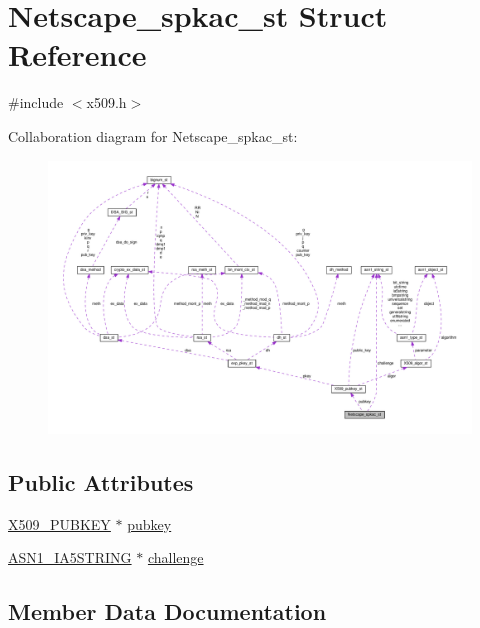 \hypertarget{struct_netscape__spkac__st}{}\section{Netscape\+\_\+spkac\+\_\+st Struct Reference}
\label{struct_netscape__spkac__st}


{\ttfamily \#include $<$x509.\+h$>$}



Collaboration diagram for Netscape\+\_\+spkac\+\_\+st\+:
\nopagebreak
\begin{figure}[H]
\begin{center}
\leavevmode
\includegraphics[width=350pt]{struct_netscape__spkac__st__coll__graph}
\end{center}
\end{figure}
\subsection*{Public Attributes}
\begin{DoxyCompactItemize}
\item 
\hyperlink{ossl__typ_8h_a9183376ae13a86ca35c75edf5412b914}{X509\+\_\+\+P\+U\+B\+K\+EY} $\ast$ \hyperlink{struct_netscape__spkac__st_ae1285ccf2bfbc84f2d57085f39a9bcd2}{pubkey}
\item 
\hyperlink{ossl__typ_8h_a0d915c339a64c1c9871d5404e51c44fd}{A\+S\+N1\+\_\+\+I\+A5\+S\+T\+R\+I\+NG} $\ast$ \hyperlink{struct_netscape__spkac__st_a7d21d91f0b8eab8b5fca8d3adef478ba}{challenge}
\end{DoxyCompactItemize}


\subsection{Member Data Documentation}

